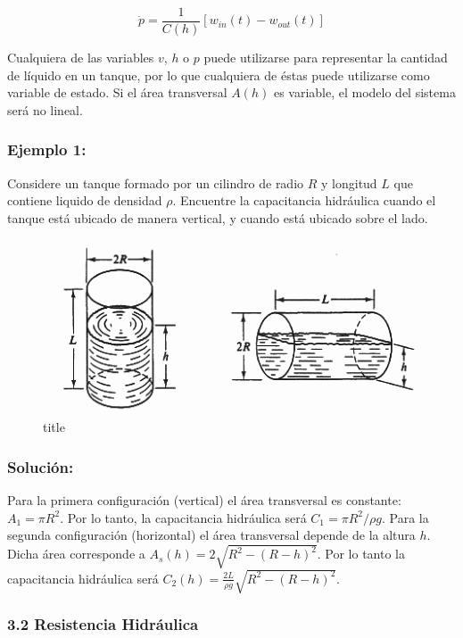 \documentclass[11pt]{article}
\makeatletter
\def\maxwidth{\ifdim\Gin@nat@width>\linewidth\linewidth
    \else\Gin@nat@width\fi}
\let\Oldincludegraphics\includegraphics
\renewcommand{\includegraphics}[1]{\Oldincludegraphics[width=.8\maxwidth]{#1}}
\makeatother
\begin{document}
    \begin{equation}
    \dot{p} = \frac{1}{C(h)} [w_{in}(t) - w_{out}(t)] 
\end{equation}

    
    Cualquiera de las variables \(v\), \(h\) o \(p\) puede utilizarse para
representar la cantidad de líquido en un tanque, por lo que cualquiera
de éstas puede utilizarse como variable de estado. Si el área
transversal \(A(h)\) es variable, el modelo del sistema será no lineal.

    \subsubsection{Ejemplo 1:}\label{ejemplo-1}

Considere un tanque formado por un cilindro de radio \(R\) y longitud
\(L\) que contiene liquido de densidad \(\rho\). Encuentre la
capacitancia hidráulica cuando el tanque está ubicado de manera
vertical, y cuando está ubicado sobre el lado.

    \begin{figure}
\centering
\includegraphics{img/cilinder_tank.png}
\caption{title}
\end{figure}

    \subsubsection{Solución:}\label{soluciuxf3n}

Para la primera configuración (vertical) el área transversal es
constante: \(A_1 =\pi R^2\). Por lo tanto, la capacitancia hidráulica
será \(C_1 = \pi R^2 / \rho g\). Para la segunda configuración
(horizontal) el área transversal depende de la altura \(h\). Dicha área
corresponde a \(A_s(h) = 2 \sqrt{R^2 - (R-h)^2}\). Por lo tanto la
capacitancia hidráulica será
\(C_2(h) = \frac{2L}{\rho g}\sqrt{R^2 - (R-h)^2}\).

    \subsubsection{3.2 Resistencia
Hidráulica}\label{resistencia-hidruxe1ulica}
\end{document}
